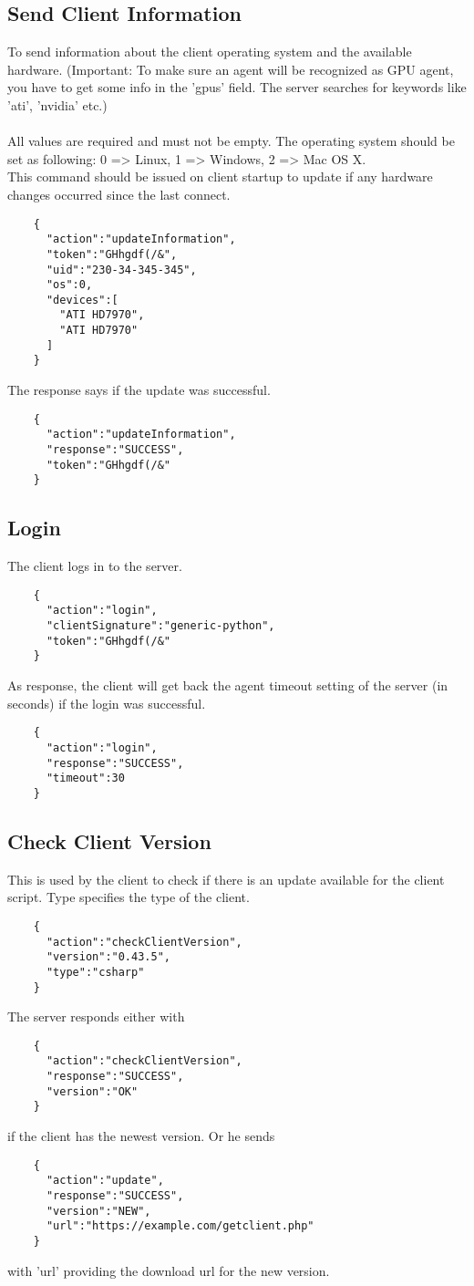 \documentclass{article}
\begin{document}
	\subsection*{Send Client Information}
	To send information about the client operating system and the available hardware. (Important: To make sure an agent will be recognized as GPU agent, you have to get some info in the 'gpus' field. The server searches for keywords like 'ati', 'nvidia' etc.)\\ \\
	All values are required and must not be empty. The operating system should be set as following: 0 => Linux, 1 => Windows, 2 => Mac OS X.\\
	This command should be issued on client startup to update if any hardware changes occurred since the last connect.
	\begin{verbatim}
	{
	  "action":"updateInformation",
	  "token":"GHhgdf(/&",
	  "uid":"230-34-345-345",
	  "os":0,
	  "devices":[
	    "ATI HD7970",
	    "ATI HD7970"
	  ]
	}
	\end{verbatim}
	
	\noindent The response says if the update was successful.
	\begin{verbatim}
	{
	  "action":"updateInformation",
	  "response":"SUCCESS",
	  "token":"GHhgdf(/&"
	} 
	\end{verbatim}
	
	\subsection*{Login}
	The client logs in to the server.
	\begin{verbatim}
	{
	  "action":"login",
	  "clientSignature":"generic-python",
	  "token":"GHhgdf(/&"
	}
	\end{verbatim}
	As response, the client will get back the agent timeout setting of the server (in seconds) if the login
	was successful.
	\begin{verbatim}
	{
	  "action":"login",
	  "response":"SUCCESS",
	  "timeout":30
	}
	\end{verbatim}
	
	\subsection*{Check Client Version}
	This is used by the client to check if there is an update available for the client script. Type specifies the type of the client.
	\begin{verbatim}
	{
	  "action":"checkClientVersion",
	  "version":"0.43.5",
	  "type":"csharp"
	}
	\end{verbatim}
	The server responds either with
	\begin{verbatim}
	{
	  "action":"checkClientVersion",
	  "response":"SUCCESS",
	  "version":"OK"
	}
	\end{verbatim}
	if the client has the newest version. Or he sends
	\begin{verbatim}
	{
	  "action":"update",
	  "response":"SUCCESS",
	  "version":"NEW",
	  "url":"https://example.com/getclient.php"
	}
	\end{verbatim}
	with 'url' providing the download url for the new version.
	
\end{document}
